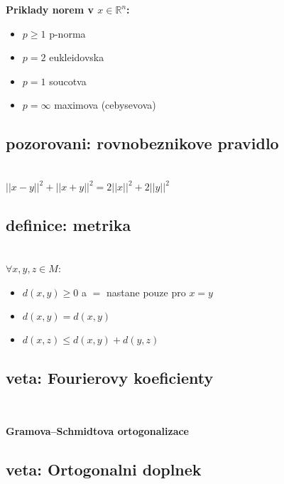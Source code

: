 \documentclass[a4paper]{article}
\newcommand{\definice}[3]{
	\setcounter{section}{#1}
	\setcounter{subsection}{#2}
	\addtocounter{subsection}{-1}
	\subsection{definice: #3}~
}
\newcommand{\veta}[3]{
	\setcounter{section}{#1}
	\setcounter{subsection}{#2}
	\addtocounter{subsection}{-1}
	\subsection{veta: #3}~
}
\newcommand{\pozorovani}[3]{
	\setcounter{section}{#1}
	\setcounter{subsection}{#2}
	\addtocounter{subsection}{-1}
	\subsection{pozorovani: #3}~
}
\begin{document}

\textbf{Priklady norem v $x\in \mathbb{R}^n$:}
\begin{itemize}
	\item $p\geq 1$ p-norma
	\item $p=2$ eukleidovska
	\item $p=1$ soucotva
	\item $p=\infty$ maximova (cebysevova)
\end{itemize}

\pozorovani{8}{20}{rovnobeznikove pravidlo}\\
$||x-y||^2 + ||x+y||^2 = 2||x||^2 + 2||y||^2$

\definice{8}{21}{metrika}\\
$\forall x,y,z \in M$:\\
\begin{itemize}
	\item $d(x,y) \geq 0$ a $=$ nastane pouze pro $x=y$
	\item $d(x,y) = d(x,y)$
	\item $d(x,z) \leq d(x,y) + d(y,z)$
\end{itemize}

\veta{8}{27}{Fourierovy koeficienty}
\textbf{Gramova–Schmidtova ortogonalizace}\\
\veta{8}{38}{Ortogonalni doplnek}
\end{document}
